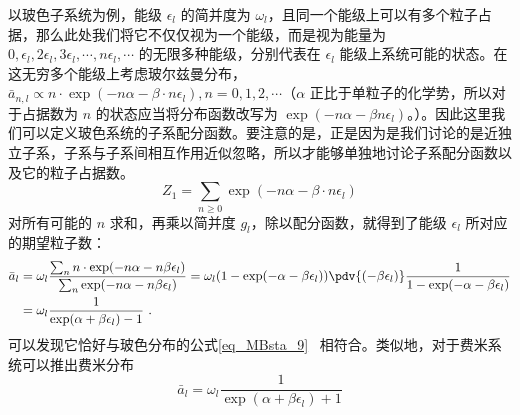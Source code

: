 以玻色子系统为例，能级 $\epsilon_l$ 的简并度为 $\omega_l$，且同一个能级上可以有多个粒子占据，那么此处我们将它不仅仅视为一个能级，而是视为能量为 $0,\epsilon_l,2\epsilon_l,3\epsilon_l,\cdots, n\epsilon_l,\cdots$ 的无限多种能级，分别代表在 $\epsilon_l$ 能级上系统可能的状态。在这无穷多个能级上考虑玻尔兹曼分布，$\bar{a}_{n,l} \propto n\cdot \exp(-n\alpha-\beta\cdot n\epsilon_l),n=0,1,2,\cdots $（$\alpha$ 正比于单粒子的化学势，所以对于占据数为 $n$ 的状态应当将分布函数改写为 $\exp(-n\alpha-\beta n\epsilon_l)$。）。因此这里我们可以定义玻色系统的子系配分函数。要注意的是，正是因为是我们讨论的是近独立子系，子系与子系间相互作用近似忽略，所以才能够单独地讨论子系配分函数以及它的粒子占据数。
\begin{equation}
Z_1=\sum_{n\ge 0} \exp(-n\alpha-\beta\cdot n\epsilon_l)
\end{equation}
对所有可能的 $n$ 求和，再乘以简并度 $g_l$，除以配分函数，就得到了能级 $\epsilon_l$ 所对应的期望粒子数：
\begin{equation}
\begin{aligned}
\bar a_l&=\omega_l \frac{\sum_n n\cdot \exp(-n\alpha-n\beta\epsilon_l)}{\sum_n \exp(-n\alpha-n\beta\epsilon_l)}=\omega_l (1-\exp(-\alpha-\beta\epsilon_l)) \pdv{(-\beta\epsilon_l)} \frac{1}{1-\exp(-\alpha-\beta\epsilon_l)}\\
&=\omega_l \frac{1}{\exp(\alpha+\beta\epsilon_l)-1}~.
\end{aligned}
\end{equation}
可以发现它恰好与玻色分布的公式\autoref{eq_MBsta_9}~ 相符合。类似地，对于费米系统可以推出费米分布
\begin{equation}
\bar a_l=\omega_l \frac{1}{\exp(\alpha+\beta\epsilon_l)+1}
\end{equation}
